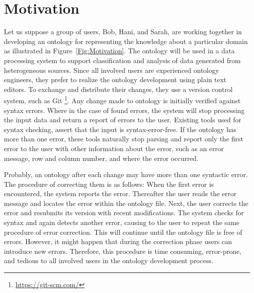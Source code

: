 
\section{Motivation}

Let us suppose a group of users, Bob, Hani, and Sarah, are working together in developing an ontology for representing the knowledge about a particular domain as illustrated in Figure~\ref{Fig:Motivation}.
The ontology will be used in a data processing system to support classification and analysis of data generated from heterogeneous sources. 
Since all involved users are experienced ontology engineers, they prefer to realize the ontology development using plain text editors.
To exchange and distribute their changes, they use a version control system, such as Git \footnote{\url{https://git-scm.com/}}.
Any change made to ontology is initially verified against syntax errors. Where in the case of found errors, the system will stop processing the input data and return a report of errors to the user. 
Existing tools used for syntax checking, assert that the input is syntax-error-free. 
If the ontology has more than one error, these tools naturally stop parsing and report only the first error to the user with other information about the error, such as an error message, row and column number, and where the error occurred.

Probably, an ontology after each change may have more than one syntactic error.
The procedure of correcting them is as follows: When the first error is encountered, the system reports the error.
Thereafter the user reads the error message and locates the error within the ontology file. 
Next, the user corrects the error and resubmits its version with recent modifications.
The system checks for syntax and again detects another error, causing to the user to repeat the same procedure of error correction.
This will continue until the ontology file is free of errors.
However, it might happen that during the correction phase users can introduce new errors.
Therefore, this procedure is time consuming, error-prone, and tedious to all involved users in the ontology development process.

